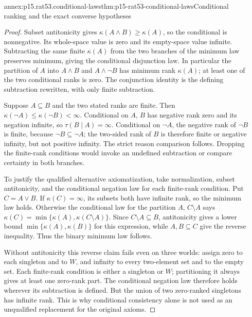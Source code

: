 \begin{annexitem}{annex:p15.rat53.conditional-laws}{thm:p15-rat53-conditional-laws}{Conditional ranking and the exact converse hypotheses}
\begin{proof}
Subset antitonicity gives \(\kappa(A\land B)\geq\kappa(A)\), so the
conditional is nonnegative.  Its whole-space value is zero and its
empty-space value infinite.  Subtracting the same finite \(\kappa(A)\)
from the two branches of the minimum law preserves minimum, giving the
conditional disjunction law.  In particular the partition of \(A\) into
\(A\land B\) and \(A\land\neg B\) has minimum rank \(\kappa(A)\);
at least one of the two conditional ranks is zero.  The conjunction identity
is the defining subtraction rewritten, with only finite subtraction.

Suppose \(A\subseteq B\) and the two stated ranks are finite.
Then \(\kappa(\neg A)\leq\kappa(\neg B)<\infty\).
Conditional on \(A\), \(B\) has negative rank zero and its negation
infinite, so \(\tau(B\mid A)=\infty\).
Conditional on \(\neg A\), the negative rank of \(\neg B\) is finite,
because \(\neg B\subseteq\neg A\); the two-sided rank of \(B\) is
therefore finite or negative infinity, but not positive infinity.
The strict reason comparison follows.  Dropping the finite-rank conditions
would invoke an undefined subtraction or compare certainty in both branches.

To justify the qualified alternative axiomatization, take normalization,
subset antitonicity, and the conditional negation law for each finite-rank
condition.  Put \(C=A\lor B\).  If \(\kappa(C)=\infty\), its subsets
both have infinite rank, so the minimum law holds.  Otherwise the
conditional law for the partition \(A\), \(C\setminus A\) says
\(\kappa(C)=\min\{\kappa(A),\kappa(C\setminus A)\}\).
Since \(C\setminus A\subseteq B\), antitonicity gives a lower bound
\(\min\{\kappa(A),\kappa(B)\}\) for this expression, while
\(A,B\subseteq C\) give the reverse inequality.  Thus the binary
minimum law follows.

Without antitonicity this reverse claim fails even on three worlds: assign
zero to each singleton and to \(W\), and infinity to every two-element
set and to the empty set.  Each finite-rank condition is either a singleton
or \(W\); partitioning it always gives at least one zero-rank part.
The conditional negation law therefore holds wherever its subtraction is
defined.  But the union of two zero-ranked singletons has infinite rank.
This is why conditional consistency alone is not used as an unqualified
replacement for the original axioms.
\end{proof}
\end{annexitem}


